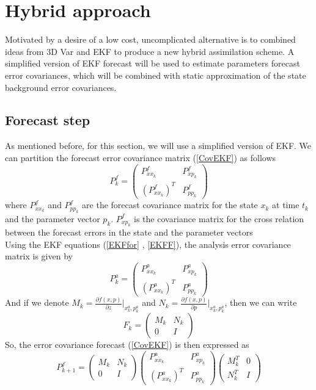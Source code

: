 \documentclass[a4,12pt]{article}
\numberwithin{equation}{section}
\begin{document}
\section{Hybrid approach}
Motivated by a desire of a low cost, uncomplicated alternative is to combined ideas from 3D Var and EKF to produce a new hybrid assimilation scheme. A simplified version of EKF forecast will be used to estimate parameters forecast error covariances, which will be combined with static approximation of the state background error covariances.

\subsection{Forecast step}
As mentioned before, for this section, we will use a simplified version of EKF. We can partition the forecast error covariance matrix  (\ref{CovEKF}) as follows
\begin{equation}
    P_k^f = 
\begin{pmatrix}
P_{xx_k}^f  & P_{xp_k}^f \\
(P_{xx_k}^f)^T &  P_{pp_k}^f 
\end{pmatrix}  
\end{equation}
where $P_{xx_k}^f $  and $P_{pp_k}^f $ are the forecast covariance matrix for the state $x_k$ at time $t_k$ and the parameter vector $p_k$. $P_{xp_k}^f $ is the covariance matrix for the cross relation between the forecast errors in the state and the parameter vectors \\
Using the EKF equations (\ref{EKFfor} , \ref{EKFF}), the analysis error covariance matrix is given by
\begin{equation}
    P_k^a = 
\begin{pmatrix}
P_{xx_k}^a & P_{xp_k}^a \\
(P_{xx_k}^a)^T &  P_{pp_k}^a
\end{pmatrix}  
\end{equation}
And if we denote $M_k = \frac{\partial f(x,p) }{ \partial z} \big|_{x_k^a, p_k^a} $ and $N_k = \frac{\partial f(x,p)}{  \partial p } \big|_{x_k^a, p_k^a}$, then we can write 
\begin{equation}
    F_k = 
\begin{pmatrix}
M_k & N_k \\
 0  & I
\end{pmatrix}  
\end{equation}
So, the error covariance forecast (\ref{CovEKF})  is then expressed as
\begin{equation}
    P_{k+1}^f =  
\begin{pmatrix}
M_k & N_k \\
 0  & I
\end{pmatrix}
\begin{pmatrix}
P_{xx_k}^a & P_{xp_k}^a \\
(P_{xx_k}^a)^T &  P_{pp_k}^a
\end{pmatrix}
\begin{pmatrix}
M_k^T & 0 \\
 N_k^T & I
\end{pmatrix}
\end{equation}
\end{document}
